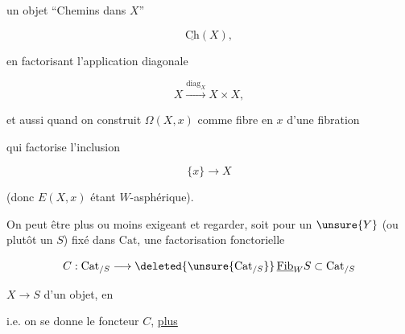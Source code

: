 
un objet ``Chemins dans $X$''

\[
\underline{\mathrm{Ch}}(X),
\]

en factorisant l'application diagonale

\[
X\xrightarrow{\mathrm{diag}_X}X\times X,
\]

et aussi quand on construit $\Omega(X,x)$ comme fibre en $x$ d'une fibration


qui factorise l'inclusion

\[
\{x\}\longrightarrow X
\]

(donc $E(X,x)$ étant $W$-asphérique).

On peut être plus ou moins exigeant et regarder, soit pour un  $\unsure{Y}$ (ou plutôt un $S$) fixé dans $\mathrm{Cat}$, une factorisation fonctorielle

\[
C:\mathrm{Cat}_{/S}\longrightarrow\deleted{\unsure{\mathrm{Cat}_{/S}}}\,\underline{\mathrm{Fib}}_W S\subset\mathrm{Cat}_{/S}
\]

 $X\longrightarrow S$ d'un objet, en


i.e. on se donne le foncteur $C$, \uline{plus}
